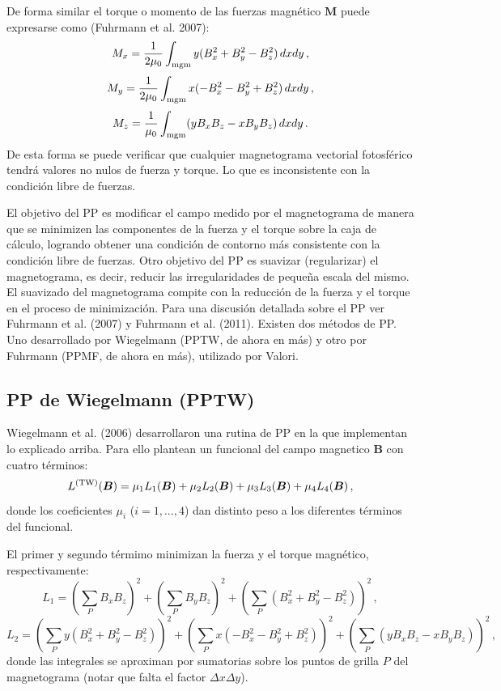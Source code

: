 \documentclass[a4paper,10pt]{article}
\def\btorque{{\boldsymbol{M}}}
\def\bB{{\boldsymbol{B}}}
\def\bx{B_x}
\def\by{B_y}
\def\bz{B_z}
\begin{document}
De forma similar el torque o momento de las fuerzas magnético $\btorque$ puede expresarse como (Fuhrmann et al. 2007):
\begin{equation}
 M_x= \frac{1}{2\mu_0} \int_{\rm mgm} y (B_x^2 + B_y^2 - B_z^2)\, dx dy \,,
\end{equation}
\begin{equation}
 M_y= \frac{1}{2\mu_0} \int_{\rm mgm} x (-B_x^2 - B_y^2 + B_z^2)\, dx dy \,,
\end{equation}
\begin{equation}
 M_z = \frac{1}{\mu_0}\int_{\rm mgm} (yB_xB_z - xB_y B_z )\, dx dy \,.
\end{equation}
De esta forma se puede verificar que cualquier magnetograma vectorial fotosférico tendrá valores no nulos de fuerza y torque. Lo que es inconsistente con la condición libre de fuerzas.

El objetivo del PP es modificar el campo medido por el magnetograma de manera que se minimizen las componentes de la fuerza y el torque sobre la caja de cálculo, logrando obtener una condición de contorno más consistente con la condición libre de fuerzas. Otro objetivo del PP es suavizar (regularizar) el magnetograma, es decir, reducir las irregularidades de pequeña escala del mismo. El suavizado del magnetograma compite con la reducción de la fuerza y el torque en el proceso de minimización.
Para una discusión detallada sobre el PP ver Fuhrmann et al. (2007) y Fuhrmann et al. (2011).
%
Existen dos métodos de PP. Uno desarrollado por Wiegelmann (PPTW, de ahora en más) y otro por Fuhrmann (PPMF, de ahora en más), utilizado por Valori.

\subsection{PP de Wiegelmann (PPTW)}

Wiegelmann et al. (2006) desarrollaron una rutina de PP en la que implementan lo explicado arriba.  Para ello plantean un funcional del campo magnetico $\bB$ con cuatro términos:
\begin{equation}
 L^{(\rm TW)}(\bB)=\mu_1L_1(\bB)+\mu_2L_2(\bB)+\mu_3L_3(\bB)+\mu_4L_4(\bB) \,,
\end{equation}
donde los coeficientes $\mu_i$ ($i=1,..., 4$) dan distinto peso a los diferentes términos del funcional.

El primer y segundo térmimo minimizan la fuerza y el torque magnético, respectivamente:
\begin{equation}
 L_1 = \left(\sum_P \bx\bz \right)^2+\left(\sum_P \by\bz \right)^2 + \left(\sum_P (\bx^2 + \by^2 - \bz^2)  \right)^2 \,,
 \label{L1}
\end{equation}
\begin{equation}
 L_2 = \left(\sum_P y(\bx^2 + \by^2 - \bz^2)  \right)^2 + \left(\sum_P x(-\bx^2 - \by^2 + \bz^2)  \right)^2 + \left(\sum_P (y\bx\bz - x\by\bz)  \right)^2 \,,
 \label{L2}
\end{equation}
donde las integrales se aproximan por sumatorias sobre los puntos de grilla $P$ del magnetograma (notar que falta el factor $\Delta x \Delta y$). 
\end{document}
